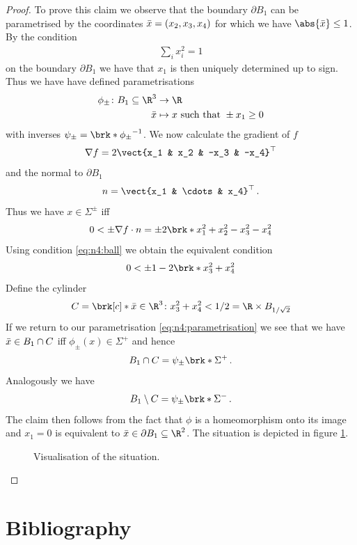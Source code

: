 \begin{proof}
To prove this claim we observe that the boundary $\partial B_1$ can be parametrised by the coordinates $\bar{x} = (x_2,x_3,x_4)$
for which we have $\abs{\bx}\leq 1$. By the condition
\begin{align}
  \sum_i x_i^2 = 1\label{eq:n4:ball}
\end{align}
on the boundary $\partial B_1$ we have that $x_1$ is then uniquely determined up to sign. Thus we have have defined parametrisations
\begin{align}
  \begin{aligned}\phi_\pm\colon B_1\subseteq\R^3&\to\R \\
  \bx&\mapsto x\text{ such that } \pm x_1\geq0
  \end{aligned}\label{eq:n4:parametrisation}
\end{align}
with inverses $\psi_\pm = \brk*{\phi_\pm}^{-1}$.
We now calculate the gradient of $f$
\begin{align*}
  \nabla f = 2\vect{x_1 & x_2 & -x_3 & -x_4}^\top
\end{align*}
and the normal to $\partial B_1$
\begin{align*}
  n = \vect{x_1 & \cdots & x_4}^\top\,.
\end{align*}
Thus we have $x\in\Sigma^\pm$ iff
\begin{align*}
  0<\pm \nabla f\cdot n = \pm 2\brk*{x_1^2+x_2^2-x_3^2-x_4^2}
\end{align*}
Using condition \eqref{eq:n4:ball} we obtain the equivalent condition
\begin{align*}
  0<\pm 1-2\brk*{x_3^2+x_4^2}
\end{align*}
Define the cylinder
\begin{align*}
  C = \brk[c]*{\bx\in \R^3\colon x_3^2+x_4^2<1/2} = \R\times B_{1/\sqrt{2}}
\end{align*}
If we return to our parametrisation \eqref{eq:n4:parametrisation} we see that we have $\bar{x}\in B_1\cap C$ iff
$\phi_\pm(x)\in \Sigma^+$ and hence 
\begin{align*}
  B_1\cap C=\psi_\pm\brk*{\Sigma^+}\,.
\end{align*}
Analogously  we have 
\begin{align*}
  B_1\setminus C=\psi_\pm\brk*{\Sigma^-}\,.
\end{align*}
The claim then follows from the fact that $\phi$ is a homeomorphism onto its image and $x_1=0$ is 
equivalent to $\bx\in \partial B_1\subseteq \R^2$. The situation is depicted in figure \ref{fi:n4_sigma}.

\begin{figure}[h]
  \centering
  \def\svgwidth{0.7\textwidth}
  
  \caption{Visualisation of the situation.}
  \label{fi:n4_sigma}
\end{figure}
\end{proof}

\clearpage

\section{Bibliography}
\nocite{*}
\printbibliography[heading=none]



